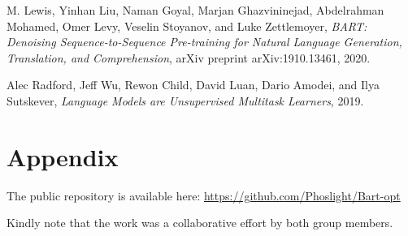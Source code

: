 \documentclass{article}
\begin{document}
\begin{thebibliography}{9}
        M. Lewis, Yinhan Liu, Naman Goyal, Marjan Ghazvininejad, Abdelrahman Mohamed, Omer Levy, Veselin Stoyanov, and Luke Zettlemoyer,
        \emph{BART: Denoising Sequence-to-Sequence Pre-training for Natural Language Generation, Translation, and Comprehension},
        arXiv preprint arXiv:1910.13461, 2020.

        Alec Radford, Jeff Wu, Rewon Child, David Luan, Dario Amodei, and Ilya Sutskever,
        \emph{Language Models are Unsupervised Multitask Learners},
        2019.


    \end{thebibliography}

    \section{Appendix}
    The public repository is available here:
    \url{https://github.com/Phoslight/Bart-opt}

    Kindly note that the work was a collaborative effort by both group members.
\end{document}
